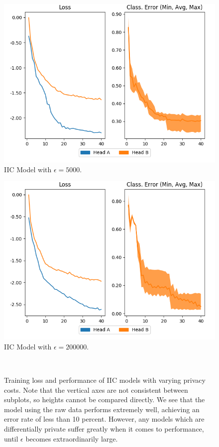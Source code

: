 \documentclass[12pt]{report}
\begin{document}
\begin{figure}[H]
\begin{minipage}{0.45\textwidth}
    \includegraphics[width=\textwidth]{figures/epsilon-5000.png}
    \centering
    IIC Model with $\epsilon=5000$.
  \end{minipage}%
  \hspace{0.09\textwidth}
  \begin{minipage}{0.45\textwidth}
    \includegraphics[width=\textwidth]{figures/epsilon-200000.png}
    \centering
    IIC Model with $\epsilon=200000$.
  \end{minipage}%
  \\[2em]
  \caption{Training loss and performance of IIC models with varying privacy costs. Note that the vertical axes are not consistent between subplots, so heights cannot be compared directly. We see that the model using the raw data performs extremely well, achieving an error rate of less than 10 percent. However, any models which are differentially private suffer greatly when it comes to performance, until $\epsilon$ becomes extraordinarily large.}
\end{figure}
\end{document}
